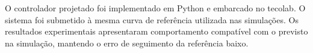O controlador projetado foi implementado em Python e embarcado no \gls{tecolab}.
O sistema foi submetido à mesma curva de referência utilizada nas simulações. Os
resultados experimentais apresentaram comportamento compatível com o previsto na
simulação, mantendo o erro de seguimento da referência baixo.